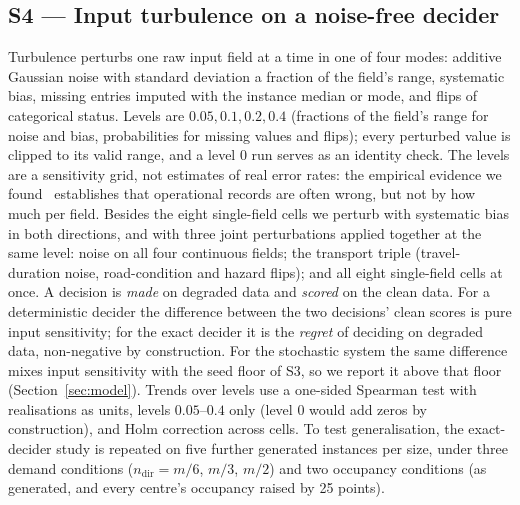 \documentclass[systems,article,submit,moreauthors,pdftex]{Definitions/mdpi}
\begin{document}
\subsection{S4 --- Input turbulence on a noise-free decider}
Turbulence perturbs one raw input field at a time in one of four modes: additive Gaussian
noise with standard deviation a fraction of the field's range, systematic bias, missing
entries imputed with the instance median or mode, and flips of categorical status. Levels
are $0.05, 0.1, 0.2, 0.4$ (fractions of the field's range for noise and bias, probabilities
for missing values and flips); every perturbed value is clipped to its valid range, and a level
$0$ run serves as an identity check. The levels are a sensitivity grid, not estimates of
real error rates: the empirical evidence we found~\cite{dehoratius2008inventory,altay2014haiti}
establishes that operational records are often wrong, but not by how much per field. Besides
the eight single-field cells we perturb with systematic bias in both directions, and with
three joint perturbations applied together at the same level: noise on all four continuous
fields; the transport triple (travel-duration noise, road-condition and hazard flips); and all
eight single-field cells at once. A decision is \emph{made} on degraded data and \emph{scored}
on the clean data. For a deterministic decider the difference between the two decisions' clean
scores is pure input sensitivity; for the exact decider it is the \emph{regret} of deciding on
degraded data, non-negative by construction. For the stochastic system the same difference
mixes input sensitivity with the seed floor of S3, so we report it above that floor
(Section~\ref{sec:model}). Trends over levels use a one-sided Spearman test with realisations
as units, levels $0.05$--$0.4$ only (level $0$ would add zeros by construction), and Holm
correction across cells. To test generalisation, the exact-decider study is repeated on five
further generated instances per size, under three demand conditions ($n_{\mathrm{dir}} = m/6$,
$m/3$, $m/2$) and two occupancy conditions (as generated, and every centre's occupancy raised
by 25 points).
\end{document}
